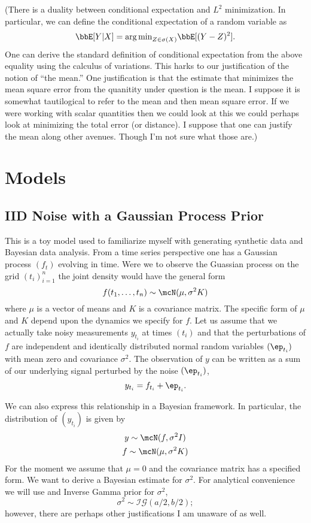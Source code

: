 \documentclass{report}
\begin{document}
(There is a duality between conditional expectation and $L^2$ minimization.  In particular, we can define the conditional expectation of a random variable as
\[
\bbE[Y | X] = {\arg \min}_{Z \in \sigma(X)} \bbE[ (Y - Z)^2 ].
\]
One can derive the standard definition of conditional expectation from the above equality using the calculus of variations.  This harks to our justification of the notion of ``the mean.'' One justification is that the estimate that minimizes the mean square error from the quanitity under question is the mean.  I suppose it is somewhat tautilogical to refer to the mean and then mean square error.  If we were working with scalar quantities then we could look at this we could perhaps look at minimizing the total error (or distance).  I suppose that one can justify the mean along other avenues.  Though I'm not sure what those are.)

\chapter{Models}

\section{IID Noise with a Gaussian Process Prior}

This is a toy model used to familiarize myself with generating synthetic data and Bayesian data analysis.  From a time series perspective one has a Gaussian process $(f_t)$ evolving in time.  Were we to observe the Guassian process on the grid $(t_i)_{i=1}^n$ the joint density would have the general form
\[
f(t_1, \ldots, t_n) \sim \mcN(\mu, \sigma^2 K)
\]
where $\mu$ is a vector of means and $K$ is a covariance matrix.  The specific form of $\mu$ and $K$ depend upon the dynamics we specify for $f$.  Let us assume that we actually take noisy measurements $y_{t_i}$ at times $(t_i)$ and that the perturbations of $f$ are independent and identically distributed normal random variables $(\ep_{t_i})$ with mean zero and covariance $\sigma^2$.  The observation of $y$ can be written as a sum of our underlying signal perturbed by the noise $(\ep_{t_i})$,
\[
y_{t_i} = f_{t_i} + \ep_{t_i}.
\]

We can also express this relationship in a Bayesian framework.  In particular, the distribution of $(y_{t_i})$ is given by
\begin{gather*}
y \sim \mcN(f, \sigma^2 I) \\
f \sim \mcN(\mu, \sigma^2 K)
\end{gather*}
For the moment we assume that $\mu = 0$ and the covariance matrix has a specified form.  We want to derive a Bayesian estimate for $\sigma^2$.  For analytical convenience we will use and Inverse Gamma prior for $\sigma^2$,
\[
\sigma^2 \sim \mathcal{IG}(a/2,b/2);
\]
however, there are perhaps other justifications I am unaware of as well.  
\end{document}
